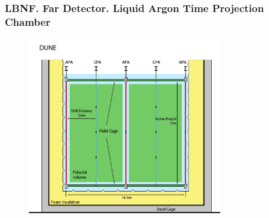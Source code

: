 \begin{frame}\frametitle{LBNF. Far Detector. Liquid Argon Time Projection Chamber}
\begin{figure}
\label{fig:farDetector_TPC}
\centering
\includegraphics[width=0.75\textwidth, keepaspectratio=true]{figs/farDetector_TPC.png}
\end{figure}
\end{frame}


